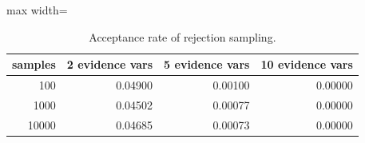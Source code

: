 \begin{table}[H]
\centering
\small
\begin{adjustbox}{max width=\linewidth}
\begin{tabular}{rrrr}
\toprule
samples & 2 evidence vars & 5 evidence vars & 10 evidence vars \\
\midrule
100 & 0.04900 & 0.00100 & 0.00000 \\
1000 & 0.04502 & 0.00077 & 0.00000 \\
10000 & 0.04685 & 0.00073 & 0.00000 \\
\bottomrule
\end{tabular}
\end{adjustbox}
\caption{Acceptance rate of rejection sampling.}
\label{tab:bn_acceptance}
\end{table}

